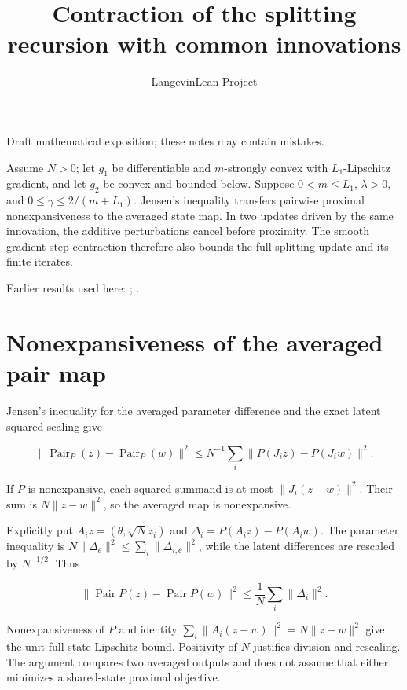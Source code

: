 \documentclass[11pt,a4paper]{article}
\title{\texorpdfstring{Contraction of the splitting recursion with common innovations}{Contraction of the splitting recursion with common innovations}}
\author{LangevinLean Project}
\date{}
\begin{document}
\maketitle
Draft mathematical exposition; these notes may contain mistakes.


Assume \(N>0\); let \(g_1\) be differentiable and \(m\)-strongly convex with \(L_1\)-Lipschitz gradient, and let \(g_2\) be convex and bounded below. Suppose \(0<m\le L_1\), \(\lambda>0\), and \(0\le\gamma\le2/(m+L_1)\). Jensen’s inequality transfers pairwise proximal nonexpansiveness to the averaged state map. In two updates driven by the same innovation, the additive perturbations cancel before proximity. The smooth gradient-step contraction therefore also bounds the full splitting update and its finite iterates.



Earlier results used here: \cite[Section~3.7]{LangevinLean2026IPLA}; \cite[Section~3.10]{LangevinLean2026ULASC}.

\section{\texorpdfstring{Nonexpansiveness of the averaged pair map}{Nonexpansiveness of the averaged pair map}}


Jensen’s inequality for the averaged parameter difference and the exact latent squared scaling give

\[\|\operatorname{Pair}_P(z)-\operatorname{Pair}_P(w)\|^2\le N^{-1}\sum_i\|P(J_i z)-P(J_i w)\|^2.\]

If \(P\) is nonexpansive, each squared summand is at most \(\|J_i(z-w)\|^2\). Their sum is \(N\|z-w\|^2\), so the averaged map is nonexpansive.



Explicitly put \(A_i z=(\theta,\sqrt N z_i)\) and \(\Delta_i=P(A_i z)-P(A_i w)\). The parameter inequality is \(N\|\overline\Delta_\theta\|^2\le\sum_i\|\Delta_{i,\theta}\|^2\), while the latent differences are rescaled by \(N^{-1/2}\). Thus

\[\|\operatorname{Pair}P(z)-\operatorname{Pair}P(w)\|^2\le\frac1N\sum_i\|\Delta_i\|^2.\]

Nonexpansiveness of \(P\) and identity \(\sum_i\|A_i(z-w)\|^2=N\|z-w\|^2\) give the unit full-state Lipschitz bound. Positivity of \(N\) justifies division and rescaling. The argument compares two averaged outputs and does not assume that either minimizes a shared-state proximal objective.
\end{document}
